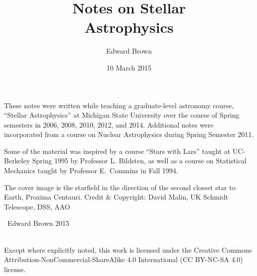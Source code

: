 \documentclass[nofonts,ls]{tufte-book}
\title{Notes on Stellar\\Astrophysics}
\author{Edward Brown}
\date{10 March 2015}
\begin{document}
\frontmatter
{}
\maketitle
\newpage
\begin{fullwidth}
\thispagestyle{empty}
These notes were written while teaching a graduate-level astronomy course, ``Stellar Astrophysics'' at Michigan State University over the course of Spring semesters in 2006, 2008, 2010, 2012, and 2014.  Additional notes were incorporated from a course on Nuclear Astrophysics during Spring Semester 2011.

Some of the material was inspired by a course ``Stars with Lars'' taught at UC-Berkeley Spring 1995 by Professor L. Bildsten, as well as a course on Statistical Mechanics taught by Professor E.~Commins in Fall 1994.

\vspace{3\baselineskip}
\noindent The cover image is the starfield in the direction of the second closest star to Earth, Proxima Centauri.  Credit \& Copyright: David Malin, UK Schmidt Telescope, DSS, AAO

\vfill
\noindent \ccCopy\ Edward Brown 2015

\vspace{3\baselineskip}
\noindent \ccbyncsa \\
\noindent Except where explicitly noted, this work is licensed under the Creative Commons
Attribution-NonCommercial-ShareAlike 4.0 International (CC BY-NC-SA
4.0) license.

\end{fullwidth}

\tableofcontents
\listoffigures

\mainmatter

















\appendix


\backmatter


\end{document}
